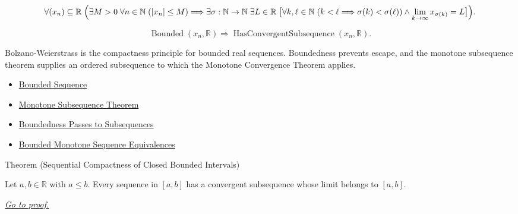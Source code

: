 \begin{remark*}
\[
\forall (x_n)\subseteq\mathbb{R}\;
\Bigl(
  \exists M>0\;\forall n\in\mathbb{N}\;(|x_n|\le M)
  \Longrightarrow
  \exists \sigma:\mathbb{N}\to\mathbb{N}\;\exists L\in\mathbb{R}\;
  \bigl[
    \forall k,\ell\in\mathbb{N}\;(k<\ell\Longrightarrow\sigma(k)<\sigma(\ell))
    \land
    \lim_{k\to\infty}x_{\sigma(k)}=L
  \bigr]
\Bigr).
\]
\end{remark*}

\begin{remark*}
\[
\operatorname{Bounded}(x_n,\mathbb{R})
\Longrightarrow
\operatorname{HasConvergentSubsequence}(x_n,\mathbb{R}).
\]
\end{remark*}

\begin{remark*}[Interpretation]
Bolzano-Weierstrass is the compactness principle for bounded real sequences.
Boundedness prevents escape, and the monotone subsequence theorem supplies an
ordered subsequence to which the Monotone Convergence Theorem applies.
\end{remark*}

\begin{dependencies}
\begin{itemize}
  \item \hyperref[def:bounded-sequence]{Bounded Sequence}
  \item \hyperref[thm:monotone-subsequence-theorem]{Monotone Subsequence Theorem}
  \item \hyperref[thm:boundedness-passes-to-subsequences]{Boundedness Passes to Subsequences}
  \item \hyperref[thm:bounded-monotone-sequence-equivalences]{Bounded Monotone Sequence Equivalences}
\end{itemize}
\end{dependencies}


\begin{theorembox}{Theorem (Sequential Compactness of Closed Bounded Intervals)}
\begin{theorem}
\label{thm:sequential-compactness-closed-bounded-interval}
Let $a,b\in\mathbb{R}$ with $a\le b$. Every sequence in $[a,b]$ has a
convergent subsequence whose limit belongs to $[a,b]$.

\smallskip
\noindent
\hyperref[prf:sequential-compactness-closed-bounded-interval]{\textit{Go to proof.}}
\end{theorem}
\end{theorembox}

